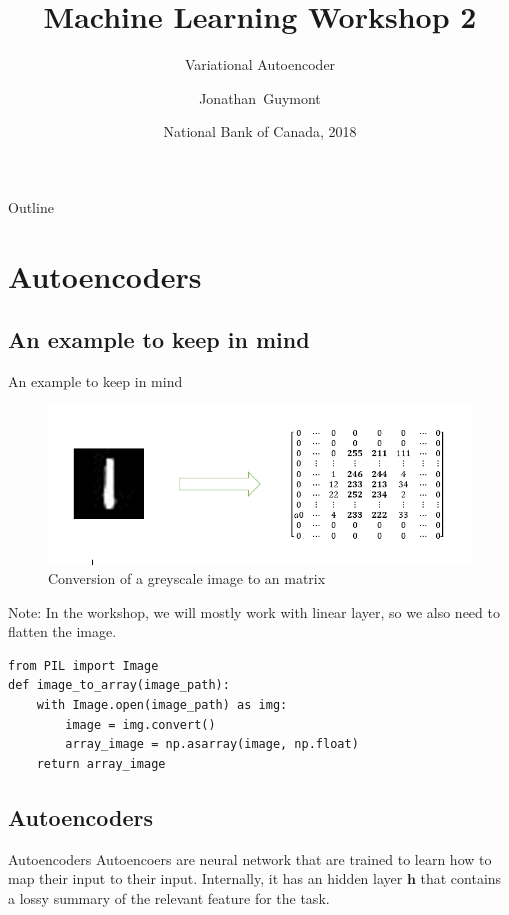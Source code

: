 \documentclass{beamer}
\title{Machine Learning Workshop 2}
\subtitle{Variational Autoencoder}
\author{Jonathan~Guymont}
\date{National Bank of Canada, 2018}
\begin{document}
\begin{frame}
	\titlepage 
\end{frame}

\begin{frame}{Outline}
	\tableofcontents
\end{frame}

\section{Autoencoders}

\subsection{An example to keep in mind}

\begin{frame}[fragile]{An example to keep in mind}
\begin{figure}
	\centering
	\includegraphics[scale=0.3]{image_to_array}
	\caption{Conversion of a greyscale image to an matrix}
\end{figure}
Note: In the workshop, we will mostly work with linear layer, so we also need to flatten the image.
\begin{verbatim}
from PIL import Image
def image_to_array(image_path):
    with Image.open(image_path) as img:
        image = img.convert()
        array_image = np.asarray(image, np.float)
    return array_image
\end{verbatim}
\end{frame}

\subsection{Autoencoders}

\begin{frame}{Autoencoders}
Autoencoers are neural network that are trained to learn how to map their input to their input. Internally, it has an hidden layer $\bm{h}$ that contains a lossy summary of the relevant feature for the task.
\end{frame}
  
\end{document}
